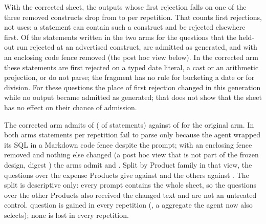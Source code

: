 \documentclass[journal,onecolumn]{IEEEtran}
\newcommand{\code}[1]{\texttt{\detokenize{#1}}}
\begin{document}
With the corrected sheet, the outputs whose first rejection falls on one of
the three removed constructs drop from \SheetOriginalAtRemoved{} to
\SheetCorrectedAtRemoved{} per repetition. That counts first rejections, not
uses: a statement can contain such a construct and be rejected elsewhere
first. Of the \SheetSevenStatements{} statements written in the two arms for
the \HeldoutSheetAdvertised{} questions that the held-out run rejected at an
advertised construct, \SheetSevenAdmitted{} are admitted as generated, and
\SheetSevenAdmittedUnfenced{} with an enclosing code fence removed (the post
hoc view below). In the corrected arm these statements are first rejected on
a typed date literal, a cast or an arithmetic projection, or do not parse;
the fragment has no rule for bucketing a date or for division. For these
questions the place of first rejection changed in this generation while no
output became admitted as generated; that does not show that the sheet has
no effect on their chance of admission.

The corrected arm admits \SheetCorrectedAdmitted{} of \HeldoutQueries{}
(\SheetCorrectedTotal{} of \SheetArmStatements{} statements) against
\SheetOriginalTotal{} of \SheetArmStatements{} for the original arm. In both
arms \SheetFencedRange{} statements per repetition fail to parse only
because the agent wrapped its SQL in a Markdown code fence despite the
prompt; with an enclosing fence removed and nothing else changed (a post hoc
view that is not part of the frozen design, digest \SheetPosthocDigest{})
the arms admit \SheetOriginalUnfenced{} and \SheetCorrectedUnfenced{}. Split
by Product family in that view, the \SheetExpenseQuestions{} questions over
the expense Products give \SheetOriginalUnfencedExpense{} against
\SheetCorrectedUnfencedExpense{} and the others
\SheetOriginalUnfencedOther{} against \SheetCorrectedUnfencedOther{}. The
split is descriptive only: every prompt contains the whole sheet, so the
questions over the other Products also received the changed text and are
not an untreated control. \SheetGainedEveryRep{} question is gained in every
repetition (\SheetGainedEveryRepNames{}, a \code{HAVING} aggregate the agent
now also selects); none is lost in every repetition.
\end{document}
